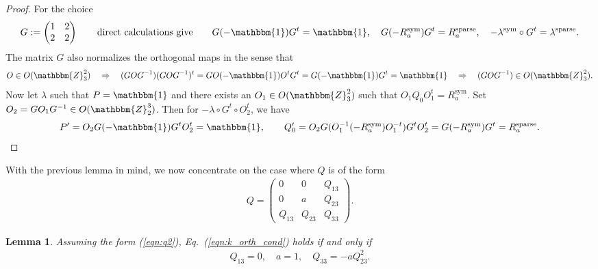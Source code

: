 \documentclass[aps,nofootinbib,floatfix,a4paper]{revtex4}
\newtheorem{lemma}[theorem]{Lemma}
\newcommand{\sym}{^\mathrm{sym}}
\newcommand{\sparse}{^\mathrm{sparse}}
\newcommand{\1}{\mbox{$\mathbf{1}$}}
\def\ZZ{\mathbbm{Z}}
\def\Id{\mathbbm{1}}
\begin{document}
\begin{proof}
	For the choice
	\begin{align*} %
		G:=
		\begin{pmatrix}
			1  & 2 \\
			2  & 2
		\end{pmatrix}
		\qquad\text{direct calculations give}\qquad
		G (-\Id)   G^t = \Id,
		\quad
		G (-R\sym_a) G^t = R\sparse_a,
		\quad
		-\lambda\sym \circ G^t = \lambda\sparse.
	\end{align*}
	The matrix $G$ also normalizes the orthogonal maps in the sense that
	\begin{align*}
		O \in O(\ZZ_3^2)
		\quad\Rightarrow\quad
		(G O G^{-1}) (G O G^{-1})^t
		=
		G O (-\Id) O^t G^t
		=
		G (-\Id) G^t
		=
		\Id
		\quad\Rightarrow\quad
		(G O G^{-1}) \in O(\ZZ_3^2).
	\end{align*}
	Now let $\lambda$ such that $P=\Id$ and there exists an $O_1\in O(\ZZ_3^2)$ such that $O_1 Q_0 O_1^t = R\sym_a$.
	Set $O_2=GO_1G^{-1} \in O(\ZZ_2^3)$.
	Then for $-\lambda\circ G^t \circ O_2^t$, we have
	\begin{align*}
		P' = O_2G(-\Id) G^tO_2^t = \Id,
		\qquad
		Q_0' 
		= O_2 G(O_1^{-1} (-R\sym_a) O_1^{-t}) G^t O_2^t
		= G (-R\sym_a) G^t
		= R\sparse_a.
	\end{align*}
\end{proof}


With the previous lemma in mind, we now concentrate on the case where $Q$ is of the form
\begin{align}\label{eqn:q2}
	Q=
	\begin{pmatrix}
		0 & 0 & Q_{13} \\
		0 & a & Q_{23} \\
		Q_{13} & Q_{23} & Q_{33}
	\end{pmatrix}.
\end{align}


\begin{lemma}\label{lem:discriminant}
	Assuming the form (\ref{eqn:q2}),
	Eq.~(\ref{eqn:k_orth_cond}) holds if and only if 
	\begin{align*}
		Q_{13}=0, \quad
		a = 1, \quad
		Q_{33}=-aQ_{23}^2.
	\end{align*}
\end{lemma}
\end{document}
